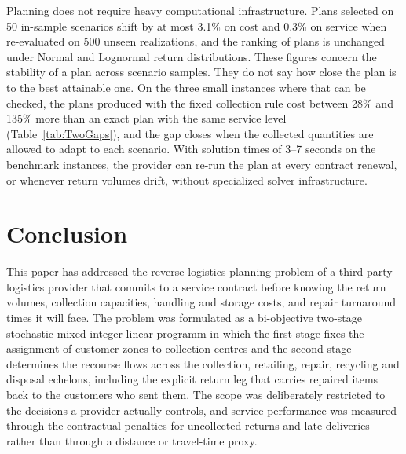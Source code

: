 \documentclass[11pt, a4paper]{article}
\begin{document}
Planning does not require heavy computational infrastructure. Plans selected on 50 in-sample scenarios shift by at most 3.1\% on cost and 0.3\% on service when re-evaluated on 500 unseen realizations, and the ranking of plans is unchanged under Normal and Lognormal return distributions. These figures concern the stability of a plan across scenario samples. They do not say how close the plan is to the best attainable one. On the three small instances where that can be checked, the plans produced with the fixed collection rule cost between 28\% and 135\% more than an exact plan with the same service level (Table~\ref{tab:TwoGaps}), and the gap closes when the collected quantities are allowed to adapt to each scenario. With solution times of 3--7 seconds on the benchmark instances, the provider can re-run the plan at every contract renewal, or whenever return volumes drift, without specialized solver infrastructure.

\section{Conclusion}

This paper has addressed the reverse logistics planning problem of a third-party logistics provider that commits to a service contract before knowing the return volumes, collection capacities, handling and storage costs, and repair turnaround times it will face. The problem was formulated as a bi-objective two-stage stochastic mixed-integer linear programm in which the first stage fixes the assignment of customer zones to collection
centres and the second stage determines the recourse flows across the collection, retailing, repair, recycling and disposal echelons, including the explicit return leg that carries repaired items back to the customers who sent them. The scope was deliberately restricted to the decisions a provider actually controls, and service performance was measured through the contractual penalties for uncollected returns and late deliveries
rather than through a distance or travel-time proxy.
\end{document}
